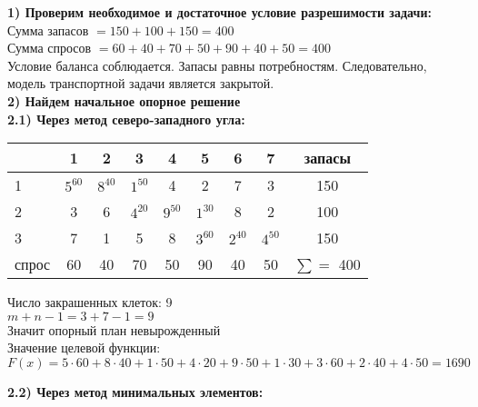 \begin{flushleft}
{\bf1) Проверим необходимое и достаточное условие разрешимости задачи:}\\
Сумма запасов $= 150 + 100 + 150 = 400$\\
Сумма спросов $= 60 + 40 + 70 + 50 + 90 + 40 + 50 = 400$\\
Условие баланса соблюдается. Запасы равны потребностям. Следовательно, модель транспортной задачи является закрытой.\\

{\bf2) Найдем начальное опорное решение}\\
{\bf2.1) Через метод северо-западного угла:}
\end{flushleft}

\begin{center}
    \begin{tabular}{|a | c | c | c | c | c | c | c | c|} 
         \hline
            & 1 & 2 & 3 & 4 & 5 & 6 & 7 & запасы\\
          &  $5^{60}$ &  $8^{40}$ &  $1^{50}$ & 4 & 2 & 7 & 3 & 150\\
          & 3 & 6 &  $4^{20}$ &  $9^{50}$ &  $1^{30}$ & 8 & 2 & 100\\
          & 7 & 1 & 5 & 8 &  $3^{60}$ &  $2^{40}$ &  $4^{50}$ & 150\\
         \hline
            спрос & 60 & 40 & 70 & 50 & 90 & 40 & 50 & $\sum =$ 400\\
        \hline
    \end{tabular}
\end{center}

\begin{flushleft}
Число закрашенных клеток: 9\\
$m + n - 1 = 3 + 7 - 1 = 9$\\
Значит опорный план невырожденный\\
Значение целевой функции:\\
$F(x) = 5 \cdot 60 + 8 \cdot 40 + 1 \cdot 50 + 4 \cdot 20 + 9 \cdot 50 + 1 \cdot 30 + 3 \cdot 60 + 2 \cdot 40 + 4 \cdot 50 = 1690$

{\bf2.2) Через метод минимальных элементов:}
\end{flushleft}

